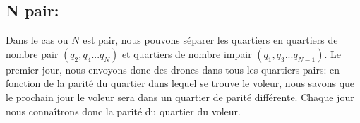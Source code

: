 \subsection{N pair:}
Dans le cas ou $N$ est pair, nous pouvons séparer les quartiers en quartiers de nombre pair $(q_2, q_4...q_N)$ et quartiers de nombre impair $(q_1, q_3...q_{N-1})$. Le premier jour, nous envoyons donc des drones dans tous les quartiers pairs: en fonction de la parité du quartier dans lequel se trouve le voleur, nous savons que le prochain jour le voleur sera dans un quartier de parité différente. Chaque jour nous connaîtrons donc la parité du quartier du voleur.

